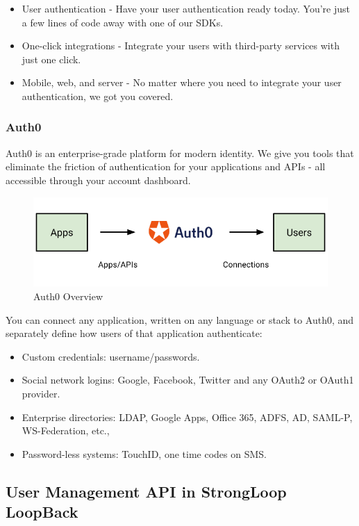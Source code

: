 \begin{itemize}
\item User authentication - Have your user authentication ready today. You're just a few lines of code away with one of our SDKs.
\item One-click integrations - Integrate your users with third-party services with just one click.
\item Mobile, web, and server - No matter where you need to integrate your user authentication, we got you covered.
\end{itemize}

\subsubsection{Auth0}

Auth0 is an enterprise-grade platform for modern identity.
We give you tools that eliminate the friction of authentication for your applications and APIs - all accessible through your account dashboard.\cite{usr_auth0}

\begin {figure}[h]
\graphicspath{{images/chapter_USR/}}
\includegraphics[width=\textwidth]{auth0}
\caption{Auth0 Overview}
\end {figure}

You can connect any application, written on any language or stack to Auth0, and separately define how users of that application authenticate:

\begin{itemize}
\item Custom credentials: username/passwords.
\item Social network logins: Google, Facebook, Twitter and any OAuth2 or OAuth1 provider.
\item Enterprise directories: LDAP, Google Apps, Office 365, ADFS, AD, SAML-P, WS-Federation, etc.,
\item Password-less systems: TouchID, one time codes on SMS.
\end{itemize}


\subsection{User Management API in StrongLoop LoopBack}

